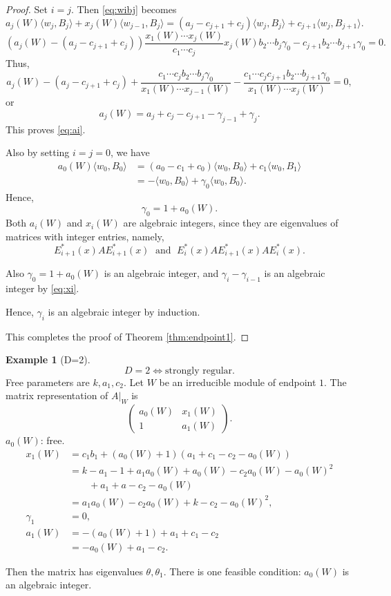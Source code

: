 \documentclass[
]{book}
\theoremstyle{definition}
\theoremstyle{definition}
\newtheorem{example}{Example}[chapter]
\theoremstyle{definition}
\theoremstyle{definition}
\theoremstyle{remark}
\begin{document}
\begin{proof}
Set \(i = j\).
Then \eqref{eq:wibj} becomes
\[
a_j(W)\langle w_j, B_j\rangle + x_{j}(W)\langle w_{j-1}, B_j\rangle
 = (a_j-c_{j+1}+c_j)\langle w_{j},B_j\rangle + c_{j+1}\langle w_{j},B_{j+1}\rangle.
\]
\[
(a_j(W) - (a_j-c_{j+1}+c_j))\frac{x_1(W)\cdots x_j(W)}{c_1\cdots c_j}
x_j(W)b_2\cdots b_j\gamma_0 - c_{j+1}b_2\cdots b_{j+1}\gamma_0 = 0.
\]
Thus,
\[a_j(W)-(a_j-c_{j+1}+c_{j}) + \frac{c_1\cdots c_jb_2\cdots b_j\gamma_0}{x_1(W)\cdots x_{j-1}(W)} - \frac{c_1\cdots c_jc_{j+1}b_2\cdots b_{j+1}\gamma_0}{x_1(W)\cdots x_j(W)} = 0,\]
or
\[a_j(W) = a_j + c_j - c_{j+1} - \gamma_{j-1} + \gamma_j.\]
This proves \eqref{eq:ai}.

Also by setting \(i = j = 0\), we have
\begin{align}
a_0(W)\langle w_0, B_0\rangle & = (a_0-c_1+c_0)\langle w_0, B_0\rangle + c_1\langle w_0, B_1\rangle\\
& = -\langle w_0, B_0\rangle + \gamma_0\langle w_0, B_0\rangle.
\end{align}
Hence,
\[\gamma_0 = 1 + a_0(W).\]
Both \(a_i(W)\) and \(x_i(W)\) are algebraic integers, since they are eigenvalues of matrices with integer entries, namely,
\[E^*_{i+1}(x)AE^*_{i+1}(x) \; \text{ and }\; E^*_i(x)AE^*_{i+1}(x)AE^*_i(x).\]

Also \(\gamma_0 = 1+a_0(W)\) is an algebraic integer, and \(\gamma_i - \gamma_{i-1}\) is an algebraic integer by \eqref{eq:xi}.

Hence, \(\gamma_i\) is an algebraic integer by induction.

This completes the proof of Theorem \ref{thm:endpoint1}.
\end{proof}

\begin{example}[D=2]
\[D = 2 \Leftrightarrow \text{strongly regular}.\]
Free parameters are \(k, a_1, c_2\).
Let \(W\) be an irreducible module of endpoint \(1\).
The matrix representation of \(A|_W\) is
\[\begin{pmatrix}
a_0(W) & x_1(W)\\ 1 & a_1(W)
\end{pmatrix}.\]
\(a_0(W)\): free.
\begin{align}
x_1(W) & = c_1b_1 + (a_0(W) + 1)(a_1 + c_1 - c_2 - a_0(W))\\
& = k - a_1 - 1 + a_1a_0(W) + a_0(W) - c_2a_0(W) - a_0(W)^2\\
& \qquad + a_1 + a - c_2 - a_0(W)\\
& = a_1a_0(W) - c_2a_0(W) + k - c_2 - a_0(W)^2,\\
\gamma_1 & = 0,\\
a_1(W) & = -(a_0(W)+1) + a_1 + c_1 - c_2\\
& = -a_0(W) + a_1 - c_2.
\end{align}

Then the matrix has eigenvalues \(\theta, \theta_1\).
There is one feasible condition: \(a_0(W)\) is an algebraic integer.
\end{example}
\end{document}
